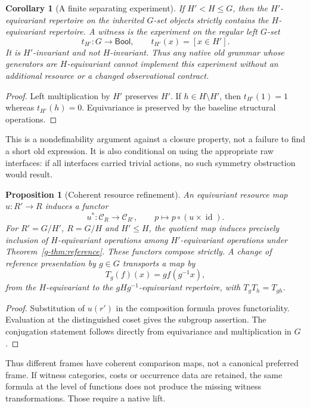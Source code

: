\documentclass[11pt]{article}
\newtheorem{proposition}[theorem]{Proposition}
\newtheorem{corollary}[theorem]{Corollary}
\theoremstyle{definition}
\theoremstyle{remark}
\newcommand{\id}{\operatorname{id}}
\newcommand{\Bool}{\mathsf{Bool}}
\newcommand{\C}{\mathcal C}
\begin{document}
\begin{corollary}[A finite separating experiment]\label{g-cor:strict}
If $H'<H\leq G$, then the $H'$-equivariant repertoire on the inherited $G$-set objects strictly contains the $H$-equivariant repertoire. A witness is the experiment on the regular left $G$-set
\[
 t_{H'}:G\longrightarrow\Bool,
 \qquad t_{H'}(x)=[x\in H'].
\]
It is $H'$-invariant and not $H$-invariant. Thus any native old grammar whose generators are $H$-equivariant cannot implement this experiment without an additional resource or a changed observational contract.
\end{corollary}
\begin{proof}
Left multiplication by $H'$ preserves $H'$. If $h\in H\setminus H'$, then $t_{H'}(1)=1$ whereas $t_{H'}(h)=0$. Equivariance is preserved by the baseline structural operations.\end{proof}

This is a nondefinability argument against a closure property, not a failure to find a short old expression. It is also conditional on using the appropriate raw interfaces: if all interfaces carried trivial actions, no such symmetry obstruction would result.

\begin{proposition}[Coherent resource refinement]\label{g-prop:refinement}
An equivariant resource map $u:R'\to R$ induces a functor
\[
 u^*: \C_R\longrightarrow\C_{R'},\qquad
 p\longmapsto p\circ(u\times\id).
\]
For $R'=G/H'$, $R=G/H$ and $H'\leq H$, the quotient map induces precisely inclusion of $H$-equivariant operations among $H'$-equivariant operations under Theorem~\ref{g-thm:reference}. These functors compose strictly. A change of reference presentation by $g\in G$ transports a map by
\[
 T_g(f)(x)=g f(g^{-1}x),
\]
from the $H$-equivariant to the $gHg^{-1}$-equivariant repertoire, with $T_gT_h=T_{gh}$.
\end{proposition}
\begin{proof}
Substitution of $u(r')$ in the composition formula proves functoriality. Evaluation at the distinguished coset gives the subgroup assertion. The conjugation statement follows directly from equivariance and multiplication in $G$.\end{proof}

Thus different frames have coherent comparison maps, not a canonical preferred frame. If witness categories, costs or occurrence data are retained, the same formula at the level of functions does not produce the missing witness transformations. Those require a native lift.
\end{document}
